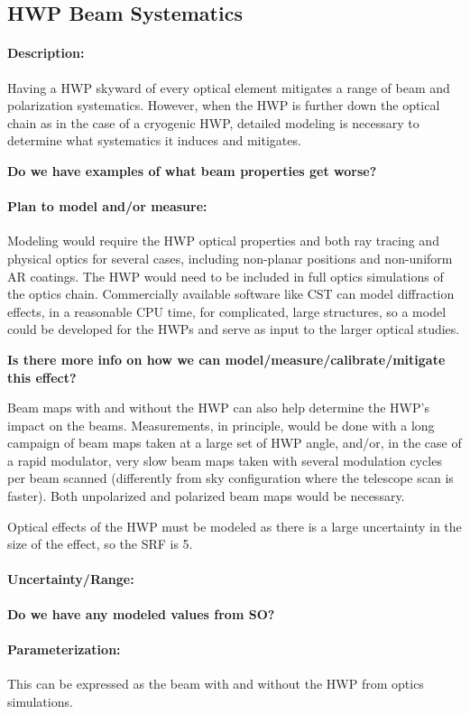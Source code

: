 
\subsection{HWP Beam Systematics}


\paragraph{Description:}
Having a HWP skyward of every optical element mitigates a range of beam and polarization systematics. However, when the HWP is further down the optical chain as in the case of a cryogenic HWP, detailed modeling is necessary to determine what systematics it induces and mitigates.

\textbf{Do we have examples of what beam properties get worse?}

\paragraph{Plan to model and/or measure:}
Modeling would require the HWP optical properties and both ray tracing and physical optics for several cases, including non-planar positions and non-uniform AR coatings. The HWP would need to be included in full optics simulations of the optics chain. Commercially available software like CST can model diffraction effects, in a reasonable CPU time, for complicated, large structures, so a model could be developed for the HWPs and serve as input to the larger optical studies.

\textbf{Is there more info on how we can model/measure/calibrate/mitigate this effect?}

Beam maps with and without the HWP can also help determine the HWP's impact on the beams. Measurements, in principle, would be done with a long campaign of beam maps taken at a large set of HWP angle, and/or, in the case of a rapid modulator, very slow beam maps taken with several modulation cycles per beam scanned (differently from sky configuration where the telescope scan is faster). Both unpolarized and polarized beam maps would be necessary.

Optical effects of the HWP must be modeled as there is a large uncertainty in the size of the effect, so the SRF is 5.

\paragraph{Uncertainty/Range:}
\textbf{Do we have any modeled values from SO?}

\paragraph{Parameterization:}
This can be expressed as the beam with and without the HWP from optics simulations.
